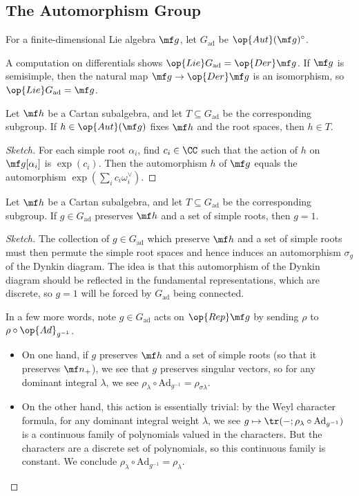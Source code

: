 \documentclass{article}
\begin{document}
\subsection{The Automorphism Group}
\begin{definition}
	For a finite-dimensional Lie algebra $\mf g$, let $G_{\mathrm{ad}}$ be $\op{Aut}(\mf g)^\circ$.
\end{definition}
\begin{remark}
	A computation on differentials shows $\op{Lie}G_{\mathrm{ad}}=\op{Der}\mf g$. If $\mf g$ is semisimple, then the natural map $\mf g\to\op{Der}\mf g$ is an isomorphism, so $\op{Lie}G_{\mathrm{ad}}=\mf g$.
\end{remark}
\begin{lemma}
	Let $\mf h$ be a Cartan subalgebra, and let $T\subseteq G_{\mathrm{ad}}$ be the corresponding subgroup. If $h\in\op{Aut}(\mf g)$ fixes $\mf h$ and the root spaces, then $h\in T$.
\end{lemma}
\begin{proof}[Sketch]
	For each simple root $\alpha_i$, find $c_i\in\CC$ such that the action of $h$ on $\mf g[\alpha_i]$ is $\exp(c_i)$. Then the automorphism $h$ of $\mf g$ equals the automorphism $\exp\left(\sum_ic_i\omega_i^\lor\right)$.
\end{proof}
\begin{lemma}
	Let $\mf h$ be a Cartan subalgebra, and let $T\subseteq G_{\mathrm{ad}}$ be the corresponding subgroup. If $g\in G_{\mathrm{ad}}$ preserves $\mf h$ and a set of simple roots, then $g=1$.
\end{lemma}
\begin{proof}[Sketch]
	The collection of $g\in G_{\mathrm{ad}}$ which preserve $\mf h$ and a set of simple roots must then permute the simple root spaces and hence induces an automorphism $\sigma_g$ of the Dynkin diagram. The idea is that this automorphism of the Dynkin diagram should be reflected in the fundamental representations, which are discrete, so $g=1$ will be forced by $G_{\mathrm{ad}}$ being connected.

	In a few more words, note $g\in G_{\mathrm{ad}}$ acts on $\op{Rep}\mf g$ by sending $\rho$ to $\rho\circ\op{Ad}_{g^{-1}}$.
	\begin{itemize}
		\item On one hand, if $g$ preserves $\mf h$ and a set of simple roots (so that it preserves $\mf n_+$), we see that $g$ preserves singular vectors, so for any dominant integral $\lambda$, we see $\rho_\lambda\circ\mathrm{Ad}_{g^{-1}}=\rho_{\sigma\lambda}$.
		\item On the other hand, this action is essentially trivial: by the Weyl character formula, for any dominant integral weight $\lambda$, we see $g\mapsto\tr(-;\rho_\lambda\circ\mathrm{Ad}_{g^{-1}})$ is a continuous family of polynomials valued in the characters. But the characters are a discrete set of polynomials, so this continuous family is constant. We conclude $\rho_\lambda\circ\mathrm{Ad}_{g^{-1}}=\rho_\lambda$.
		\qedhere
	\end{itemize}
\end{proof}
\end{document}
